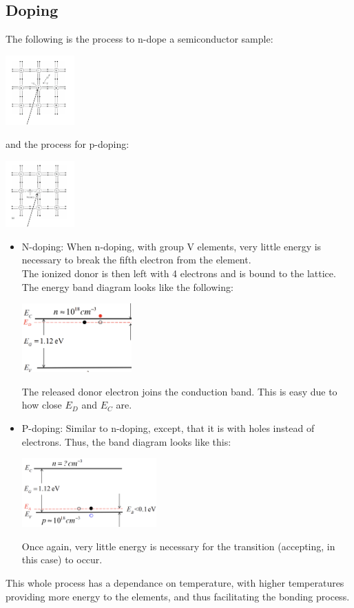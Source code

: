 \documentclass[nobib]{tufte-handout}
\begin{document}
\subsection{Doping}
The following is the process to n-dope a semiconductor sample:
\begin{center}
    \includegraphics*[width = 100px]{images/ndope.png}
\end{center}
and the process for p-doping:
\begin{center}
    \includegraphics*[width = 100px]{images/pdope.png}
\end{center}
\begin{itemize}
    \item N-doping: When n-doping, with group V elements, very little energy is necessary
          to break the fifth electron from the element.\\ The ionized donor is then left
          with 4 electrons and is bound to the lattice.\\ The energy band diagram looks
          like the following:
          \begin{center}
              \includegraphics[height = 100px]{images/energy_bond_doping.png}
          \end{center}
          The released donor electron joins the conduction band. This is easy due to how close $E_D$ and $E_C$ are.
    \item P-doping: Similar to n-doping, except, that it is with holes instead of
          electrons. Thus, the band diagram looks like this:
          \begin{center}
              \includegraphics*[height = 100px]{images/energy_p_doping.png}
          \end{center}
          Once again, very little energy is necessary for the transition (accepting, in this case) to occur.
\end{itemize}
This whole process has a dependance on temperature, with higher temperatures providing more energy to the elements, and thus facilitating the bonding process.\\
\end{document}

